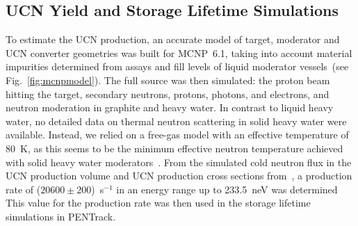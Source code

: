 

\subsection{UCN Yield and Storage Lifetime Simulations~\label{sec:yieldsims}}
To estimate the UCN production, an accurate model of target, moderator
and UCN converter geometries was built for MCNP~6.1, taking into
account material impurities determined from assays and fill levels of
liquid moderator vessels~(see Fig.~\ref{fig:mcnpmodel}). The full
source was then simulated: the proton beam hitting the target,
secondary neutrons, protons, photons, and electrons, and neutron
moderation in graphite and heavy water. In contrast to liquid heavy
water, no detailed data on thermal neutron scattering in solid heavy
water were available. Instead, we relied on a free-gas model with an
effective temperature of 80~K, as this seems to be the minimum
effective neutron temperature achieved with solid heavy water
moderators~\cite{rush1966}. From the simulated cold neutron flux in
the UCN production volume and UCN production cross sections
from~\cite{Schmidt2015,Korobkina2002}, a production rate of
($20600\pm 200$)~s$^{-1}$ in an energy range up to 233.5~neV was
determined%
This value for the production rate was then used in the storage
lifetime simulations in PENTrack.

